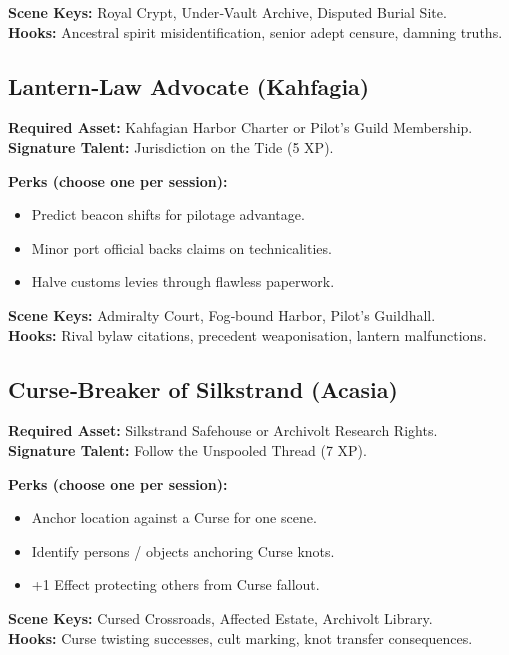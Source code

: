 \textbf{Scene Keys:} Royal Crypt, Under‑Vault Archive, Disputed Burial Site.\\
\textbf{Hooks:} Ancestral spirit misidentification, senior adept censure, damning truths.

\subsection{Lantern‑Law Advocate (Kahfagia)}\label{subsec:lantern_advocate}

\textbf{Required Asset:} Kahfagian Harbor Charter or Pilot's Guild Membership.\\
\textbf{Signature Talent:} Jurisdiction on the Tide (5 XP).

\textbf{Perks (choose one per session):}
\begin{itemize}
    \item Predict beacon shifts for pilotage advantage.
    \item Minor port official backs claims on technicalities.
    \item Halve customs levies through flawless paperwork.
\end{itemize}

\textbf{Scene Keys:} Admiralty Court, Fog‑bound Harbor, Pilot's Guildhall.\\
\textbf{Hooks:} Rival bylaw citations, precedent weaponisation, lantern malfunctions.

\subsection{Curse‑Breaker of Silkstrand (Acasia)}\label{subsec:curse_breaker}

\textbf{Required Asset:} Silkstrand Safehouse or Archivolt Research Rights.\\
\textbf{Signature Talent:} Follow the Unspooled Thread (7 XP).

\textbf{Perks (choose one per session):}
\begin{itemize}
    \item Anchor location against a Curse for one scene.
    \item Identify persons / objects anchoring Curse knots.
    \item +1 Effect protecting others from Curse fallout.
\end{itemize}

\textbf{Scene Keys:} Cursed Crossroads, Affected Estate, Archivolt Library.\\
\textbf{Hooks:} Curse twisting successes, cult marking, knot transfer consequences.

